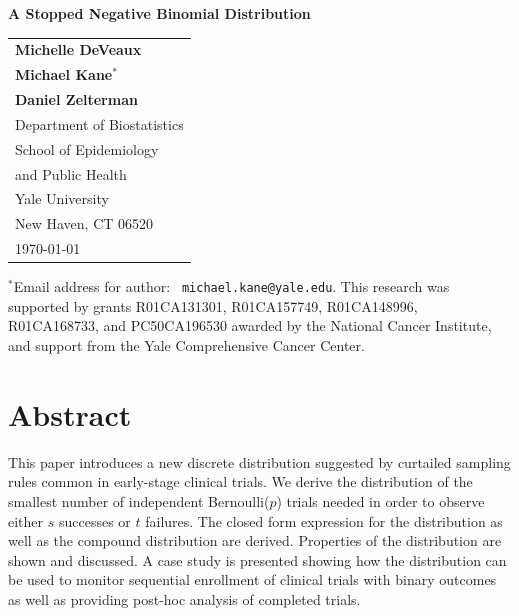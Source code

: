 \documentclass[12pt]{article}         %
\begin{document}
\thispagestyle{empty}
\begin{center}
\vspace*{\fill}

{\Large\bf A Stopped Negative Binomial Distribution} \\ [1ex]

\vspace*{1.25in}
\begin{tabular}{l} 
 {\bf Michelle DeVeaux} \\
 {\bf Michael Kane${}^*$} \\
 {\bf Daniel Zelterman}  \\[.1in]

 Department of Biostatistics \\
 School of Epidemiology  \\
 \hspace*{.15in} and Public Health  \\
 Yale University       \\
 New Haven, CT  06520  \\[.2in]

\today
\end{tabular}
\end{center}

\vspace*{\fill}

\noindent${}^*$Email address for author: {\tt
michael.kane@yale.edu}.  
This research was supported by grants R01CA131301, R01CA157749, R01CA148996, 
R01CA168733, and PC50CA196530 awarded by the National Cancer Institute, and 
support from the Yale Comprehensive Cancer Center.


\newpage
\thispagestyle{empty}

\section*    {\bf   Abstract}

This paper introduces a new discrete distribution suggested by curtailed 
sampling rules common in early-stage clinical trials. We derive the 
distribution of the smallest number of independent Bernoulli($p$) trials 
needed in order to observe either $s$ successes or $t$ failures. The closed 
form expression for the distribution as well as the compound distribution are 
derived. Properties of the distribution are shown and discussed. A case study 
is presented showing how the distribution can be used to monitor sequential 
enrollment of clinical trials with binary outcomes as well as providing 
post-hoc analysis of completed trials.
\end{document}
